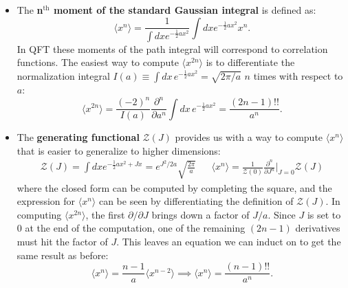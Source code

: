 \documentclass[12pt, oneside]{article}   	%
\theoremstyle{definition}
\begin{document}
\begin{itemize}
	
	\item The \textbf{n$^{\mathrm{th}}$ moment of the standard Gaussian integral} is defined as:
	\begin{equation}
		\langle x^n\rangle = \frac{1}{\int dxe^{-\frac{1}{2}ax^2}} \int dx e^{-\frac{1}{2} ax^2} x^n.
	\end{equation}
	In QFT these moments of the path integral will correspond to correlation functions. The easiest way to compute 
	$\langle x^{2n}\rangle$ is to differentiate the normalization integral $I(a)\equiv \int dx\, e^{-\frac{1}{2} ax^2} = \sqrt{2\pi / a}$ 
	$n$ times with respect to $a$:
	\begin{equation}
		\langle x^{2n}\rangle = \frac{(-2)^n}{I(a)}\frac{\partial^n}{\partial a^n} \int dx\, e^{-\frac{1}{2} ax^2} = \frac{(2n - 1)!!}{a^n}.
	\end{equation}
	
	\item The \textbf{generating functional} $\mathcal Z(J)$ provides us with a way to compute $\langle x^n\rangle$ 
	that is easier to generalize to higher dimensions:
	\begin{align}
		\mathcal Z(J) = \int dx e^{-\frac{1}{2} ax^2 + Jx} = e^{J^2 / 2a} \sqrt{\frac{2\pi}{a}} && \langle x^n\rangle = \frac{1}{\mathcal Z(0)}\frac{\partial^n}{\partial J^n}\bigg|_{J = 0}\mathcal Z(J)
	\end{align}
	where the closed form can be computed by completing the square, and the expression for $\langle x^n\rangle$ can be 
	seen by differentiating the definition of $\mathcal Z(J)$. In computing $\langle x^{2n}\rangle$, the first $\partial / 
	\partial J$ brings down a factor of $J / a$. Since $J$ is set to 0 at the end of the computation, one of the remaining 
	$(2n - 1)$ derivatives must hit the factor of $J$. This leaves an equation we can induct on to get the same result as 
	before:
	\begin{equation}
		\langle x^n \rangle = \frac{n - 1}{a} \langle x^{n - 2}\rangle\implies \langle x^n\rangle = \frac{(n - 1)!!}{a^n}.
	\end{equation}
	

\end{itemize}
\end{document}
